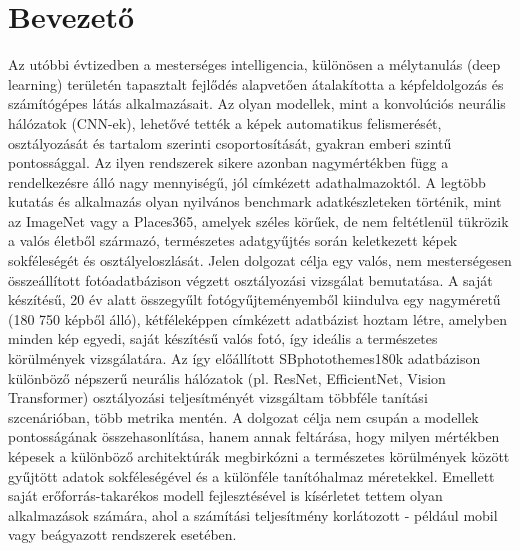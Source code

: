\chapter{Bevezető}
    Az utóbbi évtizedben a mesterséges intelligencia, különösen a mélytanulás (deep learning) területén tapasztalt fejlődés alapvetően átalakította a képfeldolgozás és számítógépes látás alkalmazásait. Az olyan modellek, mint a konvolúciós neurális hálózatok (CNN-ek), lehetővé tették a képek automatikus felismerését, osztályozását és tartalom szerinti csoportosítását, gyakran emberi szintű pontossággal. Az ilyen rendszerek sikere azonban nagymértékben függ a rendelkezésre álló nagy mennyiségű, jól címkézett adathalmazoktól. A legtöbb kutatás és alkalmazás olyan nyilvános benchmark adatkészleteken történik, mint az ImageNet vagy a Places365, amelyek széles körűek, de nem feltétlenül tükrözik a valós életből származó, természetes adatgyűjtés során keletkezett képek sokféleségét és osztályeloszlását.
    Jelen dolgozat célja egy valós, nem mesterségesen összeállított fotóadatbázison végzett osztályozási vizsgálat bemutatása. A saját készítésű, 20 év alatt összegyűlt fotógyűjteményemből kiindulva egy nagyméretű (180 750 képből álló), kétféleképpen címkézett adatbázist hoztam létre, amelyben minden kép egyedi, saját készítésű valós fotó, így ideális a természetes körülmények vizsgálatára. Az így előállított SBphotothemes180k adatbázison különböző népszerű neurális hálózatok (pl. ResNet, EfficientNet, Vision Transformer) osztályozási teljesítményét vizsgáltam többféle tanítási szcenárióban, több metrika mentén.
    A dolgozat célja nem csupán a modellek pontosságának összehasonlítása, hanem annak feltárása, hogy milyen mértékben képesek a különböző architektúrák megbirkózni a természetes körülmények között gyűjtött adatok sokféleségével és a különféle tanítóhalmaz méretekkel. Emellett saját erőforrás-takarékos modell fejlesztésével is kísérletet tettem olyan alkalmazások számára, ahol a számítási teljesítmény korlátozott - például mobil vagy beágyazott rendszerek esetében.

